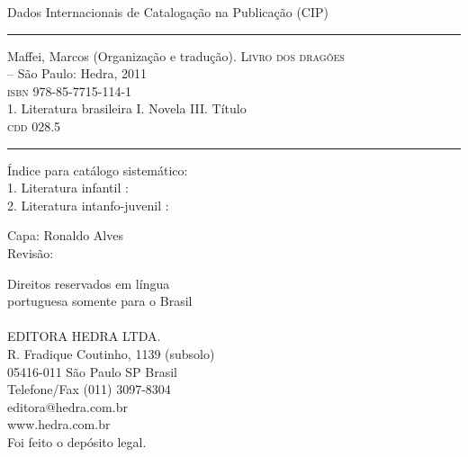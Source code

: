 \documentclass[a5,11pt]{hedrabook}
\begin{document}
{
\noindent\begin{minipage}{80mm}\thispagestyle{empty}
				{\baselineskip\footnotesize
				Dados Internacionais de Catalogação  na Publicação (CIP)\\
                                \vspace{-.3em}
				\hrule
				\vspace{1ex} 
				Maffei, Marcos (Organização e tradução). \textsc{Livro dos dragões}\\
				-- São Paulo: Hedra, 2011
				\vspace{1ex}
				\setlength{\parindent}{3ex}\\
				\textsc{isbn} 978-85-7715-114-1\\ %
                                \vspace{1ex}
				1. Literatura brasileira I. Novela III. Título\\
				\vspace{1ex}
				\noindent   {} \textsc{cdd} 028.5
				\vspace{1ex}\hrule\vspace{1ex}
				Índice para catálogo sistemático:\\
				1. Literatura infantil : \hfill\\ 
				2. Literatura intanfo-juvenil : \hfill 
                                }
\end{minipage}

\vspace{0.5cm}
\noindent Capa: Ronaldo Alves\\\EP[2]%
Revisão: \\
\vfil


{\footnotesize 
\noindent Direitos reservados em l\'ingua\\ portuguesa somente para o Brasil\\%
\ \\
	\textsc{EDITORA HEDRA LTDA.}\\%
	R. Fradique Coutinho, 1139 (subsolo)\\
	05416-011 S\~ao Paulo SP Brasil\\
	Telefone/Fax (011) 3097-8304\\
	editora@hedra.com.br\\
	www.hedra.com.br%
\ \\
	Foi feito o dep\'osito legal.
}

}
\end{document}
